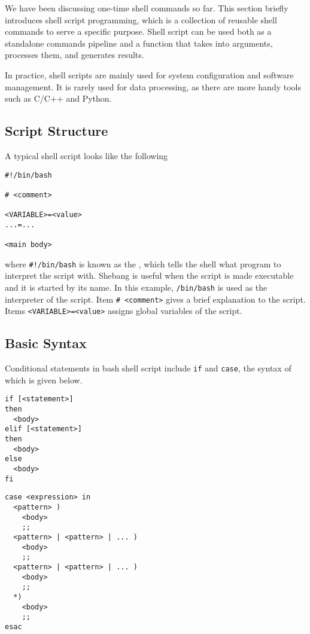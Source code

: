 We have been discussing one-time shell commands so far. This section briefly introduces shell script programming, which is a collection of reusable shell commands to serve a specific purpose. Shell script can be used both as a standalone commands pipeline and a function that takes into arguments, processes them, and generates results.

In practice, shell scripts are mainly used for system configuration and software management. It is rarely used for data processing, as there are more handy tools such as C/C++ and Python.

\subsection{Script Structure}

A typical shell script looks like the following
\begin{lstlisting}
#!/bin/bash

# <comment>

<VARIABLE>=<value>
...=...

<main body>
\end{lstlisting}
where \verb|#!/bin/bash| is known as the , which tells the shell what program to interpret the script with. Shebang is useful when the script is made executable and it is started by its name. In this example, \verb|/bin/bash| is used as the interpreter of the script. Item \verb|# <comment>| gives a brief explanation to the script. Items \verb|<VARIABLE>=<value>| assigns global variables of the script.

\subsection{Basic Syntax}

Conditional statements in bash shell script include \verb|if| and \verb|case|, the syntax of which is given below.

\begin{lstlisting}
if [<statement>]
then
  <body>
elif [<statement>]
then
  <body>
else
  <body>
fi
\end{lstlisting} 

\begin{lstlisting}
case <expression> in
  <pattern> )
    <body>
    ;;
  <pattern> | <pattern> | ... )
    <body>
    ;;
  <pattern> | <pattern> | ... )
    <body>
    ;;
  *)
    <body>
    ;;
esac
\end{lstlisting}

